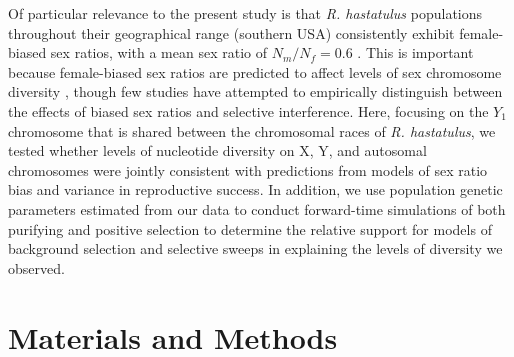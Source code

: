 \documentclass[9pt,twocolumn,twoside]{gsajnl}
\begin{document}
Of particular relevance to the present study is that \textit{R. hastatulus} populations throughout their geographical range (southern USA) consistently exhibit female-biased sex ratios, with a mean sex ratio of $N_{m}/N_{f}=0.6$ \citep{pickup2013influence}. This is important because female-biased sex ratios are predicted to affect levels of sex chromosome diversity \citep{ellegren2009}, though few studies have attempted to empirically distinguish between the effects of biased sex ratios and selective interference. Here, focusing on the $Y_{1}$ chromosome that is shared between the chromosomal races of \textit{R. hastatulus}, we tested whether levels of nucleotide diversity on X, Y, and autosomal chromosomes were jointly consistent with predictions from models of sex ratio bias and variance in reproductive success. In addition, we use population genetic parameters estimated from our data to conduct forward-time simulations of both purifying and positive selection to determine the relative support for models of background selection and selective sweeps in explaining the levels of diversity we observed.

\section*{Materials and Methods}
\end{document}
